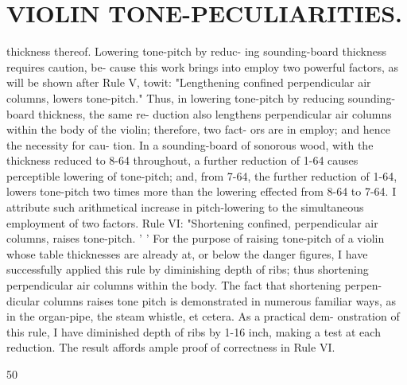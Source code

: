 \documentclass{article}
\begin{document}
\section*{VIOLIN TONE-PECULIARITIES.}
thickness thereof. Lowering tone-pitch by reduc- ing sounding-board thickness requires caution, be- cause this work brings into employ two powerful factors, as will be shown after Rule V, towit: "Lengthening confined perpendicular air columns, lowers tone-pitch." Thus, in lowering tone-pitch by reducing sounding-board thickness, the same re- duction also lengthens perpendicular air columns within the body of the violin; therefore, two fact- ors are in employ; and hence the necessity for cau- tion. In a sounding-board of sonorous wood, with the thickness reduced to 8-64 throughout, a further reduction of 1-64 causes perceptible lowering of tone-pitch; and, from 7-64, the further reduction of 1-64, lowers tone-pitch two times more than the lowering effected from 8-64 to 7-64. I attribute such arithmetical increase in pitch-lowering to the simultaneous employment of two factors. Rule VI: "Shortening confined, perpendicular air columns, raises tone-pitch. ' ' For the purpose of raising tone-pitch of a violin whose table thicknesses are already at, or below the danger figures, I have successfully applied this rule by diminishing depth of ribs; thus shortening perpendicular air columns within the body. The fact that shortening perpen- dicular columns raises tone pitch is demonstrated in numerous familiar ways, as in the organ-pipe, the steam whistle, et cetera. As a practical dem- onstration of this rule, I have diminished depth of ribs by 1-16 inch, making a test at each reduction. The result affords ample proof of correctness in Rule VI.

50
\end{document}
